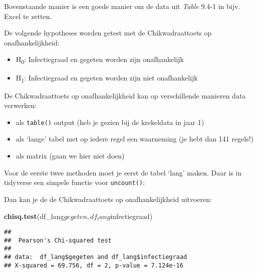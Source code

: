 \documentclass[]{book}
\newenvironment{Shaded}{\begin{snugshade}}{\end{snugshade}}
\newcommand{\KeywordTok}[1]{\textcolor[rgb]{0.13,0.29,0.53}{\textbf{{#1}}}}
\newcommand{\StringTok}[1]{\textcolor[rgb]{0.31,0.60,0.02}{{#1}}}
\newcommand{\NormalTok}[1]{{#1}}
\providecommand{\tightlist}{%
  \setlength{\itemsep}{0pt}\setlength{\parskip}{0pt}}
\theoremstyle{definition}
\theoremstyle{definition}
\theoremstyle{definition}
\theoremstyle{remark}
\begin{document}
Bovenstaande manier is een goede manier om de data uit \emph{Table}
9.4-1 in bijv. Excel te zetten.

De volgende hypotheses worden getest met de Chikwadraattoets op
onafhankelijkheid:

\begin{itemize}
\tightlist
\item
  H\textsubscript{0}: Infectiegraad en gegeten worden zijn onafhankelijk
\item
  H\textsubscript{1}: Infectiegraad en gegeten worden zijn niet
  onafhankelijk
\end{itemize}

De Chikwadraattoets op onafhankelijkheid kan op verschillende manieren
data verwerken:

\begin{itemize}
\tightlist
\item
  als \texttt{table()} output (heb je gezien bij de krekeldata in jaar
  1)
\item
  als `lange' tabel met op iedere regel een waarneming (je hebt dan 141
  regels!)
\item
  als matrix (gaan we hier niet doen)
\end{itemize}

Voor de eerste twee methoden moet je eerst de tabel `lang' maken. Daar
is in tidyverse een simpele functie voor \texttt{uncount()}:

\begin{Shaded}
\end{Shaded}

Dan kan je de de Chikwadraattoets op onafhankelijkheid uitvoeren:

\begin{Shaded}
\begin{Highlighting}[]
\KeywordTok{chisq.test}\NormalTok{(df_lang$gegeten, df_lang$infectiegraad)}
\end{Highlighting}
\end{Shaded}

\begin{verbatim}
## 
##  Pearson's Chi-squared test
## 
## data:  df_lang$gegeten and df_lang$infectiegraad
## X-squared = 69.756, df = 2, p-value = 7.124e-16
\end{verbatim}
\end{document}
